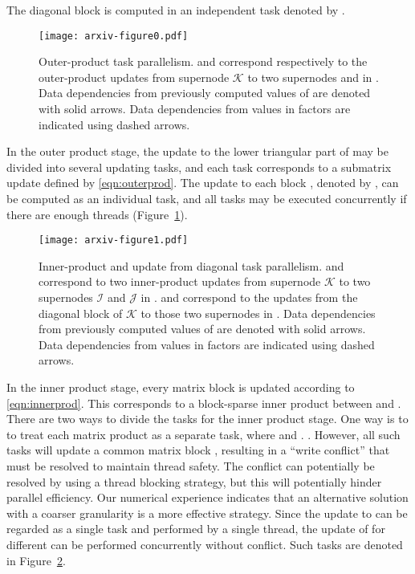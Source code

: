 \documentclass[10pt, conference, compsocconf,letterpaper,twocolumn]{IEEEtran}
\newcommand{\JS}{\ensuremath{\mathcal J}\xspace}
\newcommand{\IS}{\ensuremath{\mathcal I}\xspace}
\newcommand{\KS}{\ensuremath{\mathcal K}\xspace}
\begin{document}
The diagonal block  is computed in an independent task denoted by .



\begin{figure}[htbp]
\centering
\begin{adjustbox}{width=\linewidth}
\texttt{[image: arxiv-figure0.pdf]}
\end{adjustbox}
\caption{Outer-product task parallelism.  and  correspond respectively to the outer-product updates from supernode \KS to two supernodes  and  in . Data dependencies from previously computed values of  are denoted with solid arrows. Data dependencies from values in  factors are indicated using dashed arrows.}
\label{fig:outer}
\end{figure}

In the outer product stage, the update to the lower triangular part of  may be divided into several updating tasks, and each task corresponds to a submatrix update defined by \eqref{eqn:outerprod}.
The update to each block , denoted by , can be 
computed as an individual task, and all tasks may be executed 
concurrently if there are enough threads (Figure~\ref{fig:outer}). 



\begin{figure}[htbp]
\centering
\begin{adjustbox}{width=\linewidth}
\texttt{[image: arxiv-figure1.pdf]}
\end{adjustbox}
\caption{Inner-product and update from diagonal task parallelism.  and  correspond to two inner-product updates from supernode \KS to two supernodes \IS and \JS in .  and  correspond to the updates from the diagonal block of \KS to those two supernodes in . Data dependencies from previously computed values of  are denoted with solid arrows. Data dependencies from values in  factors are indicated using dashed arrows.}
\label{fig:inner}
\end{figure}

In the inner product stage, every matrix block   is updated according to \eqref{eqn:innerprod}.
This corresponds to a block-sparse inner product between  and .
There are two ways to divide the tasks for the inner product stage. One way is to to treat each matrix product  as a separate task, where 
 and .
. However, all such tasks will update a common matrix block , resulting in a ``write conflict'' that must be resolved to maintain thread safety. The conflict can potentially be resolved by using a thread blocking strategy, but this will potentially hinder parallel efficiency.
Our numerical experience indicates that an alternative
solution with a coarser granularity is a more effective strategy.
Since the update to
 can be regarded as a single task and performed by a single thread, the update of  for different  can be performed concurrently without conflict. Such tasks are denoted  in Figure~\ref{fig:inner}.
\end{document}
